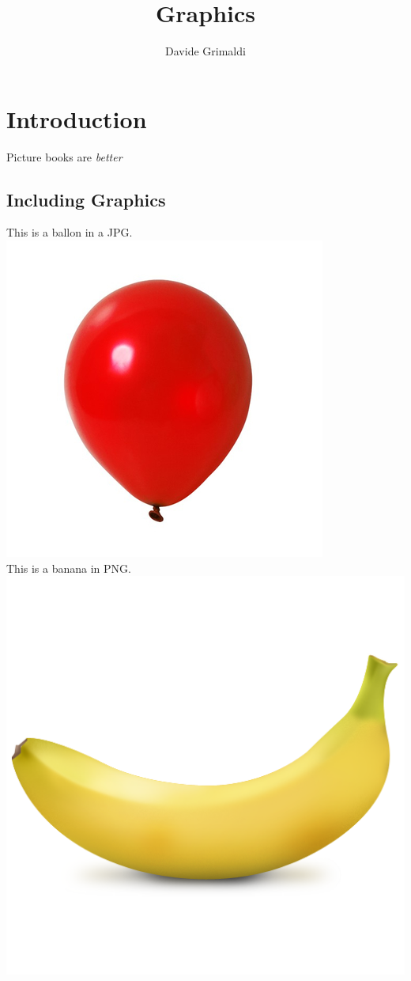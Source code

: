 \documentclass{article}
\title{Graphics}
\author{Davide Grimaldi}
\date{}
\begin{document}
    \maketitle
    \section{Introduction}
        Picture books are \emph{better}

        \subsection{Including Graphics}
            This is a ballon in a JPG.\\
            \includegraphics[scale=0.1]{ballon.jpg} %
            \vspace{1cm}\\
            This is a banana in PNG.\\
            \includegraphics[scale=0.1]{banana.png}
\end{document}
